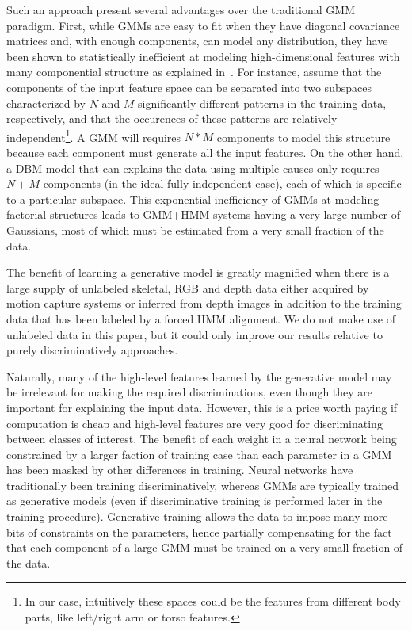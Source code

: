 Such an approach present several advantages over the traditional GMM paradigm.
%
First, while  GMMs are easy to fit when they have diagonal covariance matrices and, with enough components,
can model any distribution, they have been shown to statistically inefficient at modeling high-dimensional features
with many componential structure as explained in~\cite{mohamed2012acoustic}.
%
For instance, assume that the components of the input feature space can be separated into two subspaces
characterized by  $N$  and $M$ significantly different  patterns in the training data, respectively, and that the occurences
of these patterns are relatively independent\footnote{In our case, intuitively these spaces could be the  features from different body parts,
like left/right arm or torso features.}.
%
A GMM will requires $N*M$ components to model this structure because each component must generate all the input features.
%
On the other hand, a DBM model that can explains the data using multiple causes only requires $N+M$ components
(in the ideal fully independent case), each of which is specific to a particular subspace.
%
This exponential inefficiency of GMMs at modeling factorial structures leads to GMM+HMM systems having
a very large number of Gaussians, most of which must be estimated from a very small fraction of the data.


The benefit of learning a generative model is greatly magnified when there is a large supply of unlabeled skeletal, RGB and depth data either acquired by motion capture systems or inferred from depth images in addition to the training data that has been labeled by a forced HMM alignment. We do not make use of unlabeled data in this paper, but it could only improve our results relative to purely discriminatively approaches.

Naturally, many of the high-level features learned by the generative model may be irrelevant for making the required discriminations, even though they are important for explaining the input data. However, this is a price worth paying if computation is cheap and high-level features are very good for discriminating between classes of interest.
The benefit of each weight in a neural network being constrained by a larger faction of training case than each parameter in a GMM has been masked by other differences in training. Neural networks have traditionally been training discriminatively, whereas GMMs are typically trained as generative models (even if discriminative training is performed later in the training procedure). Generative training allows the data to impose many more bits of constraints on the parameters, hence partially compensating for the fact that each component of a large GMM must be trained on a very small fraction of the data.

